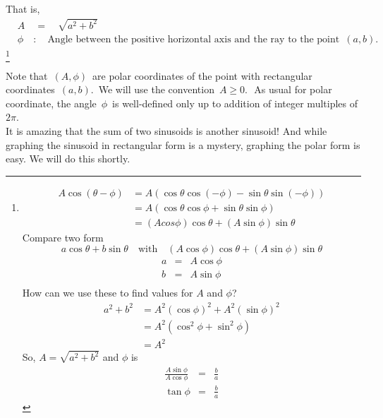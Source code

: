 That is,
\begin{align*}
  &A \quad = \quad \sqrt{a^2 + b^2} \\
  &\phi \quad : \quad
    \text {Angle between the positive horizontal axis and the ray to the point }\, (a, b).
\end{align*} \footnote{
  \begin{align*}
    A \cos (\theta - \phi) &= A \left(\cos\theta \cos(-\phi) - \sin \theta \sin(-\phi) \right) \\
    &= A \left(\cos\theta \cos \phi + \sin \theta \sin \phi \right) \\
    &= (A cos \phi) \cos \theta + (A \sin \phi) \sin \theta
  \end{align*}
  Compare two form
  \begin{equation*}
    a \cos \theta + b \sin \theta \quad \text{with} \quad
    (A \cos \phi) \cos \theta + (A \sin \phi) \sin \theta
  \end{equation*}
  \begin{eqnarray*}
    a &=& A \cos \phi\\
    b &=& A \sin \phi \\
  \end{eqnarray*}
  How can we use these to find values for $A$ and $\phi$?
  \begin{align*}
    a^2 + b^2 &= A^2 (\cos \phi)^2 + A^2(\sin \phi)^2 \\
              &= A^2(\cos^2 \phi + \sin^2 \phi) \\
              &= A^2
  \end{align*}
  So, $\displaystyle A \displaystyle = \displaystyle \sqrt{a^2 + b^2}$ and
  $\phi$ is
  \begin{eqnarray*}
    \displaystyle \frac{A \sin \phi}{A \cos \phi}
    &\displaystyle = & \displaystyle \frac{b}{a}\\
    \tan \phi &=& \frac{b}{a}                                                                     
  \end{eqnarray*}
}

Note that $\, (A,\phi )\,$ are polar coordinates of the point with rectangular coordinates
$\, (a,b).\,$ We will use the convention $\, A\geq 0.\, \,$
As usual for polar coordinate, the angle $\, \phi \,$ is well-defined
only up to addition of integer multiples of $2\pi$. \\

It is amazing that the sum of two sinusoids is another sinusoid!
And while graphing the sinusoid in rectangular form is a mystery,
graphing the polar form is easy. We will do this shortly. 
\clearpage

